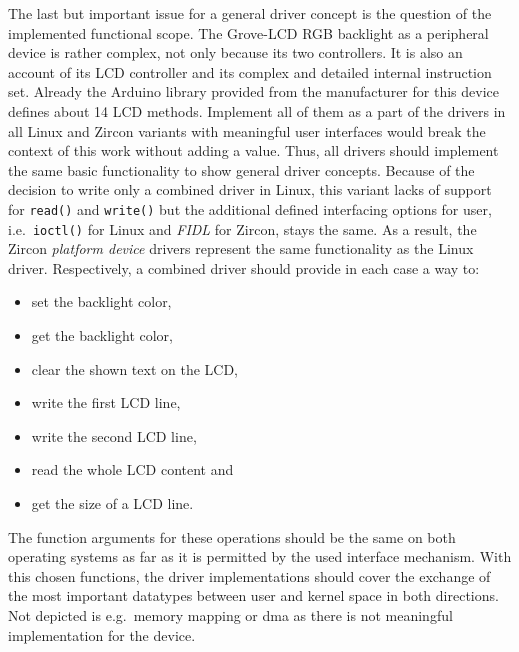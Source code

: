 The last but important issue for a general driver concept is the question of the implemented functional scope.
The Grove-LCD RGB backlight as a peripheral device is rather complex, not only because its two controllers.
It is also an account of its LCD controller and its complex and detailed internal instruction set.
Already the Arduino library provided from the manufacturer for this device defines about 14 LCD methods.
Implement all of them as a part of the drivers in all Linux and Zircon variants with meaningful user interfaces would break the context of this work without adding a value.
Thus, all drivers should implement the same basic functionality to show general driver concepts.
Because of the decision to write only a combined driver in Linux, this variant lacks of support for \texttt{read()} and \texttt{write()} but the additional defined interfacing options for user, i.e.\ \texttt{ioctl()} for Linux and \textit{FIDL} for Zircon, stays the same.
As a result, the Zircon \textit{platform device} drivers represent the same functionality as the Linux driver.
Respectively, a combined driver should provide in each case a way to:
\begin{itemize}
    \item set the backlight color,
    \item get the backlight color,
    \item clear the shown text on the LCD,
    \item write the first LCD line,
    \item write the second LCD line,
    \item read the whole LCD content and
    \item get the size of a LCD line.
\end{itemize}
The function arguments for these operations should be the same on both operating systems as far as it is permitted by the used interface mechanism.
With this chosen functions, the driver implementations should cover the exchange of the most important datatypes between user and kernel space in both directions.
Not depicted is e.g.\ memory mapping or \ac{dma} as there is not meaningful implementation for the device.

